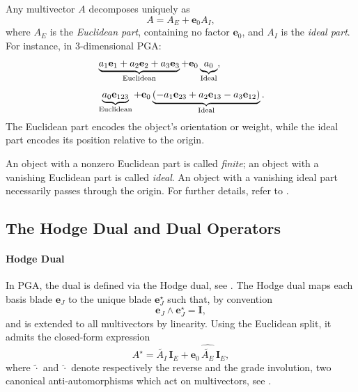 \documentclass{birkjour}
\theoremstyle{definition}
\theoremstyle{remark}
\begin{document}
Any multivector $A$ decomposes uniquely as
\begin{equation}
  A = A_E + \mathbf{e}_0 A_I,
\end{equation}
where $A_E$ is the \emph{Euclidean part}, containing no factor $\mathbf{e}_0$,
and $A_I$ is the \emph{ideal part}. For instance, in $3$-dimensional PGA:
\begin{align}
    \nonumber
    & \underbrace{a_1\mathbf{e}_1 + a_2\mathbf{e}_2 + a_3\mathbf{e}_3}_{\text{Euclidean}}
     + \mathbf{e}_0 \underbrace{a_0}_{\text{Ideal}}, \\[4pt]
    \nonumber
    & \underbrace{a_0\mathbf{e}_{123}}_{\text{Euclidean}}
     + \mathbf{e}_0 \underbrace{%
         (-a_1\mathbf{e}_{23} + a_2\mathbf{e}_{13} - a_3\mathbf{e}_{12})%
       }_{\text{Ideal}}.
\end{align}
The Euclidean part encodes the object's orientation or weight, while
the ideal part encodes its position relative to the origin.

An object with a nonzero Euclidean part is called \emph{finite}; an object with a vanishing Euclidean part is called \emph{ideal}. An object with a vanishing ideal part necessarily passes through the origin.
For further details, refer to \cite{dorstmaytheforquebewithyou}.

\subsection{The Hodge Dual and Dual Operators}
\label{sec:dual}

\paragraph{Hodge Dual}
In PGA, the dual is defined via the Hodge dual, see \cite{gunn2011geometrykinematicsrigidbody}.
The Hodge dual maps each basis blade $\mathbf{e}_J$ to the unique
blade $\mathbf{e}_J^\star$ such that, by convention
\begin{equation}
  \mathbf{e}_J \wedge \mathbf{e}_J^\star = \mathbf{I},
\end{equation}
and is extended to all multivectors by linearity.
Using the Euclidean split, it admits the closed-form expression
\begin{equation}
  A^\star = \widetilde{A_I}\,\mathbf{I}_E
          + \mathbf{e}_0\,\widehat{\widetilde{A_E}}\,\mathbf{I}_E,
  \label{eq:dual}
\end{equation}
where $\widetilde{\cdot}$ and $\widehat{\cdot}$ denote respectively the reverse and the grade involution,
two canonical anti-automorphisms which act on multivectors, see \cite{LeoBook}.
\end{document}
